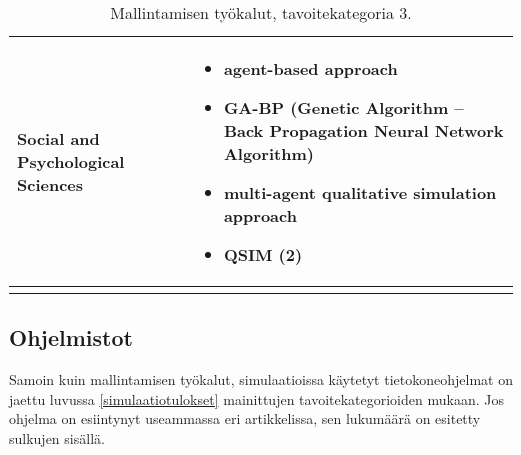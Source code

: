 \documentclass[utf8]{gradu3}
\begin{document}
\begin{longtable}[h]{|p{5cm}|p{8cm}|}
    \hline
        Social and Psychological Sciences & \begin{itemize}
        \item agent-based approach
        \item GA-BP (Genetic Algorithm – Back Propagation Neural Network Algorithm)
        \item multi-agent qualitative simulation approach
        \item QSIM (2)
    \end{itemize} \\
    \hline
    \caption{Mallintamisen työkalut, tavoitekategoria 3.}
    \label{table:mallintaminen 3.}
\end{longtable}


\subsection{Ohjelmistot}
Samoin kuin mallintamisen työkalut, simulaatioissa käytetyt
tietokoneohjelmat on jaettu luvussa \ref{simulaatiotulokset} 
mainittujen tavoitekategorioiden mukaan. Jos ohjelma on esiintynyt useammassa eri 
artikkelissa, sen lukumäärä on esitetty sulkujen sisällä.
\end{document}
